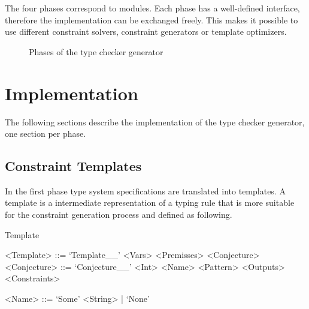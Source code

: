 The four phases correspond to modules. Each phase has a well-defined
interface, therefore the implementation can be exchanged freely. This
makes it possible to use different constraint solvers, constraint
generators or template optimizers.

\begin{figure}
\caption{Phases of the type checker generator}
\label{fig:phases}
\end{figure}
\section{Implementation}
\label{sec:implementation}
The following sections describe the implementation of the type checker
generator, one section per phase.

\subsection{Constraint Templates}
\label{sec:constraint-templates}
In the first phase type system specifications are translated into
templates. A template is a intermediate representation of a typing
rule that is more suitable for the constraint generation process and
defined as following.

\begin{definition}{Template}
  \begin{grammar}
    <Template> ::= `Template__' <Vars> <Premisses> <Conjecture>
    <Conjecture> ::= `Conjecture__' <Int> <Name> <Pattern> <Outputs> <Constraints>

    <Name> ::= `Some' <String> | `None'
  \end{grammar}
\end{definition}

